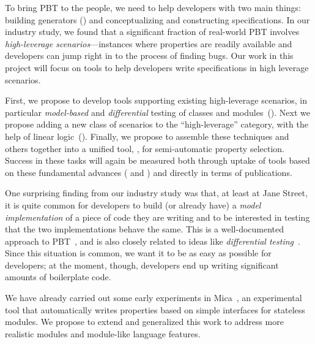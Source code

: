 
%
To bring PBT to the people, we need to help developers with two main
things: building generators () and conceptualizing and constructing
specifications.
%
In our industry study, we found that a significant fraction of real-world PBT
involves {\em high-leverage scenarios}---instances where properties are
readily available and developers can jump right in to the process of finding
bugs.
%
Our work in this project will focus on tools to help developers write
specifications in high leverage scenarios.

First, we
propose to develop tools
supporting existing high-leverage scenarios, in particular {\em
model-based} and {\em differential} testing of classes and
modules~(). Next we propose
adding a new class of scenarios to the ``high-leverage'' category, with the
help of linear logic~(). Finally, we propose
to assemble these
techniques and others together into a unified tool, {\em \GhostChat}, for
semi-automatic property selection.
%
Success in these tasks will again be measured both through
uptake of
tools based on these fundamental advances ( and
) and directly in terms of publications.

%
One surprising finding from our industry study was that, at least at
Jane Street,
it is quite common for developers to build (or already have) a {\em
model implementation} of a piece of code they are writing and to be
interested in testing that the two
implementations behave the same.  This is a well-documented approach to
PBT~\cite{hughes_experiences_2016}, and is also closely related to ideas like
{\em differential testing}~\cite{mckeeman1998differential}.
%
Since this situation is common, we want it to be as easy as possible
for developers; at the moment, though, developers end up writing
significant amounts of boilerplate code.

We have already carried out some early experiments in
Mica~\cite{Ng2023MicaPoster}, an experimental tool that automatically
writes properties based on simple interfaces for stateless modules.
We propose to extend and generalized this work to address more
realistic modules and module-like language features.

